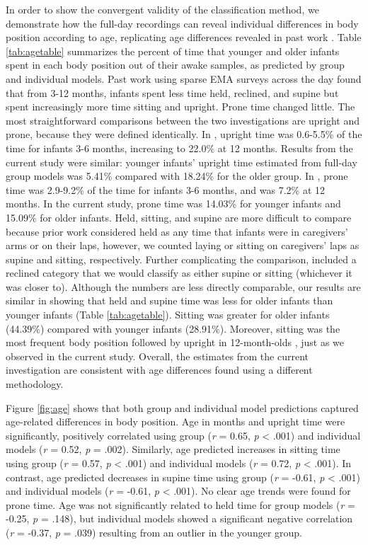 \documentclass[
  man]{apa6}
\begin{document}
In order to show the convergent validity of the classification method, we demonstrate how the full-day recordings can reveal individual differences in body position according to age, replicating age differences revealed in past work \autocite{Survey}. Table \ref{tab:agetable} summarizes the percent of time that younger and older infants spent in each body position out of their awake samples, as predicted by group and individual models. Past work using sparse EMA surveys across the day \autocite{Survey} found that from 3-12 months, infants spent less time held, reclined, and supine but spent increasingly more time sitting and upright. Prone time changed little. The most straightforward comparisons between the two investigations are upright and prone, because they were defined identically. In \textcite{Survey}, upright time was 0.6-5.5\% of the time for infants 3-6 months, increasing to 22.0\% at 12 months. Results from the current study were similar: younger infants' upright time estimated from full-day group models was 5.41\% compared with 18.24\% for the older group. In \textcite{Survey}, prone time was 2.9-9.2\% of the time for infants 3-6 months, and was 7.2\% at 12 months. In the current study, prone time was 14.03\% for younger infants and 15.09\% for older infants. Held, sitting, and supine are more difficult to compare because prior work \autocite{Survey} considered held as any time that infants were in caregivers' arms or on their laps, however, we counted laying or sitting on caregivers' laps as supine and sitting, respectively. Further complicating the comparison, \textcite{Survey} included a reclined category that we would classify as either supine or sitting (whichever it was closer to). Although the numbers are less directly comparable, our results are similar in showing that held and supine time was less for older infants than younger infants (Table \ref{tab:agetable}). Sitting was greater for older infants (44.39\%) compared with younger infants (28.91\%). Moreover, sitting was the most frequent body position followed by upright in 12-month-olds \autocite{Survey}, just as we observed in the current study. Overall, the estimates from the current investigation are consistent with age differences found using a different methodology.

Figure \ref{fig:age} shows that both group and individual model predictions captured age-related differences in body position. Age in months and upright time were significantly, positively correlated using group (\emph{r} = 0.65, \emph{p} \textless{} .001) and individual models (\emph{r} = 0.52, \emph{p} = .002). Similarly, age predicted increases in sitting time using group (\emph{r} = 0.57, \emph{p} \textless{} .001) and individual models (\emph{r} = 0.72, \emph{p} \textless{} .001). In contrast, age predicted decreases in supine time using group (\emph{r} = -0.61, \emph{p} \textless{} .001) and individual models (\emph{r} = -0.61, \emph{p} \textless{} .001). No clear age trends were found for prone time. Age was not significantly related to held time for group models (\emph{r} = -0.25, \emph{p} = .148), but individual models showed a significant negative correlation (\emph{r} = -0.37, \emph{p} = .039) resulting from an outlier in the younger group.
\end{document}
